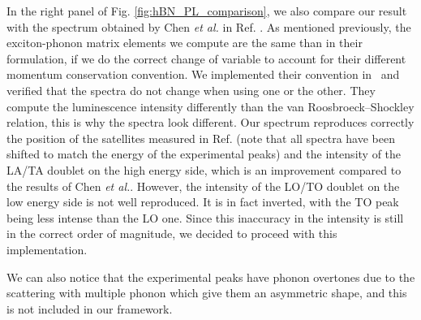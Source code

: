 In the right panel of Fig. \ref{fig:hBN_PL_comparison}, we also compare our result with the spectrum obtained by Chen \textit{et al.} in Ref. \cite{chen2020exciton}. As mentioned previously, the exciton-phonon matrix elements we compute are the same than in their formulation, if we do the correct change of variable to account for their different momentum conservation convention. We implemented their convention in \yambo~and verified that the spectra do not change when using one or the other. They compute the luminescence intensity differently than the van Roosbroeck--Shockley relation, this is why the spectra look different. Our spectrum reproduces correctly the position of the satellites measured in Ref. \cite{schue2019bright} (note that all spectra have been shifted to match the energy of the experimental peaks) and the intensity of the LA/TA doublet on the high energy side, which is an improvement compared to the results of Chen \textit{et al.}. However, the intensity of the LO/TO doublet on the low energy side is not well reproduced. It is in fact inverted, with the TO peak being less intense than the LO one. Since this inaccuracy in the intensity is still in the correct order of magnitude, we decided to proceed with this implementation. 

We can also notice that the experimental peaks have phonon overtones due to the scattering with multiple phonon which give them an asymmetric shape,\cite{vuong2017exciton} and this is not included in our framework.

